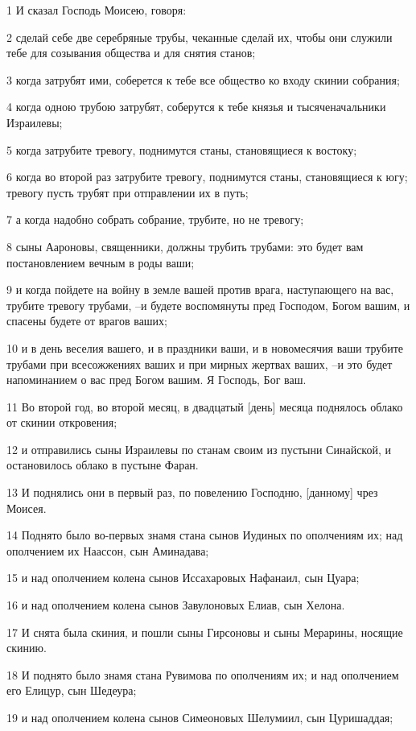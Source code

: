 \par 1 И сказал Господь Моисею, говоря:
\par 2 сделай себе две серебряные трубы, чеканные сделай их, чтобы они служили тебе для созывания общества и для снятия станов;
\par 3 когда затрубят ими, соберется к тебе все общество ко входу скинии собрания;
\par 4 когда одною трубою затрубят, соберутся к тебе князья и тысяченачальники Израилевы;
\par 5 когда затрубите тревогу, поднимутся станы, становящиеся к востоку;
\par 6 когда во второй раз затрубите тревогу, поднимутся станы, становящиеся к югу; тревогу пусть трубят при отправлении их в путь;
\par 7 а когда надобно собрать собрание, трубите, но не тревогу;
\par 8 сыны Аароновы, священники, должны трубить трубами: это будет вам постановлением вечным в роды ваши;
\par 9 и когда пойдете на войну в земле вашей против врага, наступающего на вас, трубите тревогу трубами, --и будете воспомянуты пред Господом, Богом вашим, и спасены будете от врагов ваших;
\par 10 и в день веселия вашего, и в праздники ваши, и в новомесячия ваши трубите трубами при всесожжениях ваших и при мирных жертвах ваших, --и это будет напоминанием о вас пред Богом вашим. Я Господь, Бог ваш.
\par 11 Во второй год, во второй месяц, в двадцатый [день] месяца поднялось облако от скинии откровения;
\par 12 и отправились сыны Израилевы по станам своим из пустыни Синайской, и остановилось облако в пустыне Фаран.
\par 13 И поднялись они в первый раз, по повелению Господню, [данному] чрез Моисея.
\par 14 Поднято было во-первых знамя стана сынов Иудиных по ополчениям их; над ополчением их Наассон, сын Аминадава;
\par 15 и над ополчением колена сынов Иссахаровых Нафанаил, сын Цуара;
\par 16 и над ополчением колена сынов Завулоновых Елиав, сын Хелона.
\par 17 И снята была скиния, и пошли сыны Гирсоновы и сыны Мерарины, носящие скинию.
\par 18 И поднято было знамя стана Рувимова по ополчениям их; и над ополчением его Елицур, сын Шедеура;
\par 19 и над ополчением колена сынов Симеоновых Шелумиил, сын Цуришаддая;
